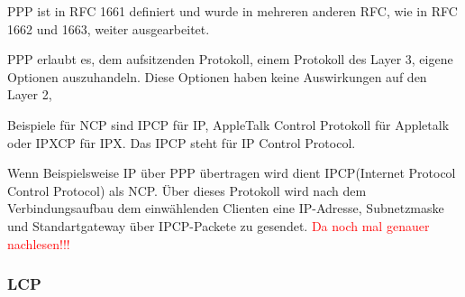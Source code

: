 \documentclass[12pt, a4paper, ngerman]{article}
\begin{document}
PPP ist in RFC 1661 definiert und wurde in mehreren anderen RFC, wie in RFC 1662 und 1663, weiter ausgearbeitet.

PPP erlaubt es, dem aufsitzenden Protokoll, einem Protokoll des Layer 3, eigene Optionen auszuhandeln. Diese Optionen haben keine Auswirkungen auf den Layer 2, 

Beispiele für NCP sind IPCP für IP, AppleTalk Control Protokoll für Appletalk oder IPXCP für IPX. Das IPCP steht für IP Control Protocol.

Wenn Beispielsweise IP über PPP übertragen wird dient IPCP(Internet Protocol Control Protocol) als NCP. Über dieses Protokoll wird nach dem Verbindungsaufbau dem einwählenden Clienten eine IP-Adresse, Subnetzmaske und Standartgateway über IPCP-Packete zu gesendet. 
\large{{\textcolor{red}{Da noch mal genauer nachlesen!!!}}}

\subsubsection{LCP}
\end{document}
